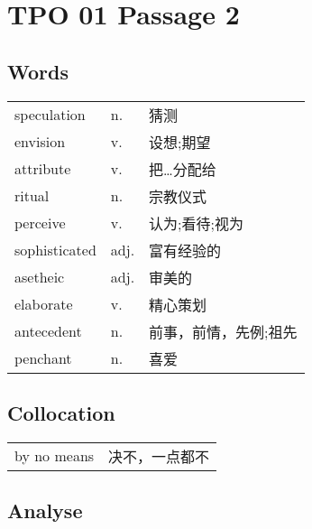 \section{TPO 01 Passage 2}

\subsection{Words}

\begin{tabular}{lll}
    speculation   & n.   & 猜测          \\
    envision      & v.   & 设想;期望       \\
    attribute     & v.   & 把…分配给       \\
    ritual        & n.   & 宗教仪式        \\
    perceive      & v.   & 认为;看待;视为    \\
    sophisticated & adj. & 富有经验的       \\
    asetheic      & adj. & 审美的         \\
    elaborate     & v.   & 精心策划        \\
    antecedent    & n.   & 前事，前情，先例;祖先 \\
    penchant      & n.   & 喜爱          \\
\end{tabular}

\subsection{Collocation}

\begin{tabular}{ll}
    by no means & 决不，一点都不 \\
\end{tabular}

\subsection{Analyse}

